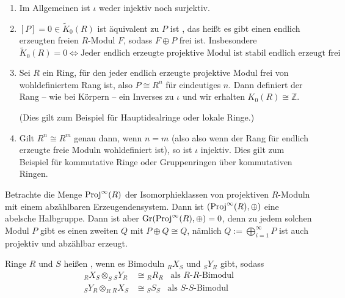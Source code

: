 \begin{bemerkung}
	\leavevmode
	\begin{enumerate}[1)]
		\item Im Allgemeinen ist $\iota$ weder injektiv noch surjektiv.
		\item $[P]=0 \in \tilde{K}_0(R)$ ist äquivalent zu $P$ ist , das heißt es gibt einen endlich erzeugten freien $R$-Modul $F$, sodass $F \oplus P$ frei ist.
		Insbesondere 
		\[
			\tilde{K}_0(R) =0 \iff \text{Jeder endlich erzeugte projektive Modul ist stabil endlich erzeugt frei} 
		\]
		\item Sei $R$ ein Ring, für den jeder endlich erzeugte projektive Modul frei von wohldefiniertem Rang ist, also $P \cong R^n$ für eindeutiges $n$.
		Dann definiert der Rang -- wie bei Körpern -- ein Inverses zu $\iota$ und wir erhalten $K_0(R)\cong \mathbb{Z}$.
		
		(Dies gilt zum Beispiel für Hauptidealringe oder lokale Ringe.)
		\item Gilt $R^n \cong R^m$ genau dann, wenn $n=m$ (also also wenn der Rang für endlich erzeugte freie Moduln wohldefiniert ist), so ist $\iota$ injektiv.
		Dies gilt zum Beispiel für kommutative Ringe oder Gruppenringen über kommutativen Ringen. 
	\end{enumerate}
\end{bemerkung}

\begin{beispiel}[{name={Eilenberg-Schwindel}}]
	Betrachte die Menge $\Proj^\infty(R)$ der Isomorphieklassen von projektiven $R$-Moduln mit einem abzählbaren Erzeugendensystem.
	Dann ist $\enbrace*{\Proj^\infty(R), \oplus }$ eine abelsche Halbgruppe.
	Dann ist aber $\Gr\enbrace*{\Proj^\infty(R),\oplus}=0$, denn zu jedem solchen Modul $P$ gibt es einen zweiten $Q$ mit $P \oplus Q \cong Q$, nämlich $Q := \bigoplus_{i=1}^\infty P$ ist auch projektiv und abzählbar erzeugt.
\end{beispiel}

\begin{definition}[{name=[Morita-äquivalent]}]
	Ringe $R$ und $S$ heißen , wenn es Bimoduln $_R X_S$ und $_S Y _R$ gibt, sodass 
	\begin{equation}
		\begin{split}
			{_R X_S} \otimes_S {_S Y _R} &\cong {_R R_R} \enspace\text{ als $R$-$R$-Bimodul} \\ 
			{_S Y _R} \otimes_R {_R X_S} &\cong {_S S_S} \enspace\text{ als $S$-$S$-Bimodul}
		\end{split} \tag{\#}\label{eq:def:morita}
	\end{equation}
\end{definition}

